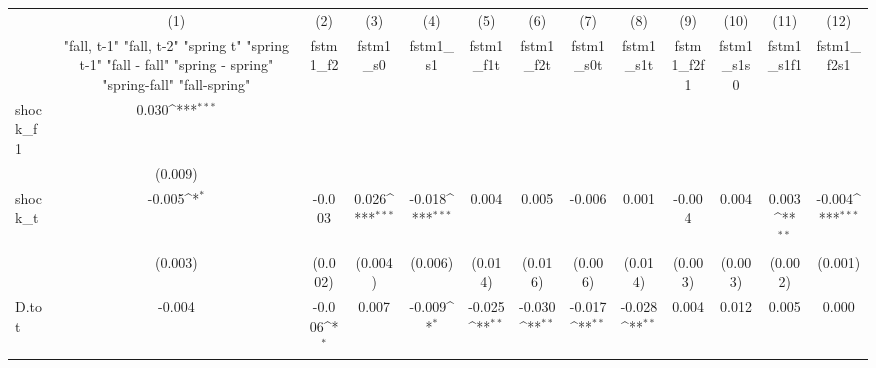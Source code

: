 {
\def\sym#1{\ifmmode^{#1}\else\(^{#1}\)\fi}
\begin{tabular}{l*{12}{c}}
\toprule
            &\multicolumn{1}{c}{(1)}&\multicolumn{1}{c}{(2)}&\multicolumn{1}{c}{(3)}&\multicolumn{1}{c}{(4)}&\multicolumn{1}{c}{(5)}&\multicolumn{1}{c}{(6)}&\multicolumn{1}{c}{(7)}&\multicolumn{1}{c}{(8)}&\multicolumn{1}{c}{(9)}&\multicolumn{1}{c}{(10)}&\multicolumn{1}{c}{(11)}&\multicolumn{1}{c}{(12)}\\
            &\multicolumn{1}{c}{  "fall, t-1" "fall, t-2" "spring t" "spring t-1"  "fall - fall" "spring - spring" "spring-fall" "fall-spring" }&\multicolumn{1}{c}{fstm1\_f2}&\multicolumn{1}{c}{fstm1\_s0}&\multicolumn{1}{c}{fstm1\_s1}&\multicolumn{1}{c}{fstm1\_f1t}&\multicolumn{1}{c}{fstm1\_f2t}&\multicolumn{1}{c}{fstm1\_s0t}&\multicolumn{1}{c}{fstm1\_s1t}&\multicolumn{1}{c}{fstm1\_f2f1}&\multicolumn{1}{c}{fstm1\_s1s0}&\multicolumn{1}{c}{fstm1\_s1f1}&\multicolumn{1}{c}{fstm1\_f2s1}\\
\midrule
shock\_f1    &       0.030\sym{***}&                     &                     &                     &                     &                     &                     &                     &                     &                     &                     &                     \\
            &     (0.009)         &                     &                     &                     &                     &                     &                     &                     &                     &                     &                     &                     \\
\addlinespace
shock\_t     &      -0.005\sym{*}  &      -0.003         &       0.026\sym{***}&      -0.018\sym{***}&       0.004         &       0.005         &      -0.006         &       0.001         &      -0.004         &       0.004         &       0.003\sym{**} &      -0.004\sym{***}\\
            &     (0.003)         &     (0.002)         &     (0.004)         &     (0.006)         &     (0.014)         &     (0.016)         &     (0.006)         &     (0.014)         &     (0.003)         &     (0.003)         &     (0.002)         &     (0.001)         \\
\addlinespace
D.tot       &      -0.004         &      -0.006\sym{*}  &       0.007         &      -0.009\sym{*}  &      -0.025\sym{**} &      -0.030\sym{**} &      -0.017\sym{**} &      -0.028\sym{**} &       0.004         &       0.012         &       0.005         &       0.000         \\

\end{tabular}}
